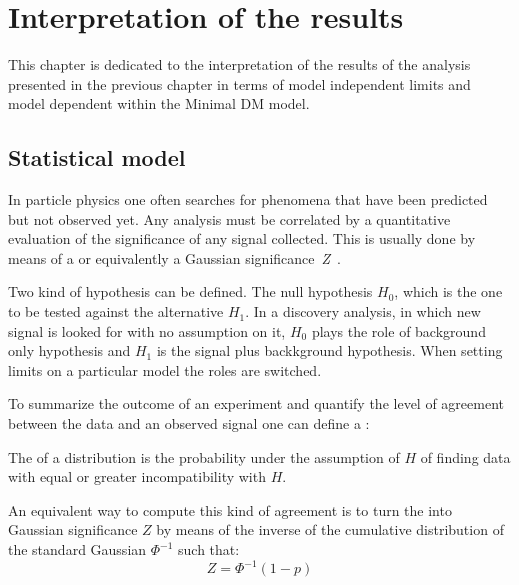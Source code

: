 \chapter{Interpretation of the results}

\lettrine{T}{}his chapter is dedicated to the interpretation of the results of the \mph analysis presented in the previous chapter in terms of model independent limits and model dependent within the Minimal DM model. 

\section{Statistical model}
In particle physics one often searches for phenomena that have been predicted but not observed yet. Any analysis must be correlated by a quantitative evaluation of the significance of any signal collected. This is usually done by means of a \p or equivalently a Gaussian \mbox{significance \emph{Z}~\cite{Cowan}}.

Two kind of hypothesis can be defined. The null hypothesis $H_{0}$, which is the one to be tested against the alternative $H_{1}$. In a discovery analysis, in which new signal is looked for with no assumption on it, $H_{0}$ plays the role of background only hypothesis and $H_{1}$ is the signal plus backkground hypothesis. When setting limits on a particular model the roles are switched.

To summarize the outcome of an experiment and quantify the level of agreement between the data and an observed signal one can define a \p:
\begin{definizione}
  The \p of a distribution is the probability under the assumption of $H$ of finding data with equal or greater incompatibility with $H$.
\end{definizione}

An equivalent way to compute this kind of agreement is to turn the \p into Gaussian significance $Z$ by means of the inverse of the cumulative distribution of the standard Gaussian $\Phi^{-1}$ such that:
\begin{equation}
  Z = \Phi^{-1}(1-p)
\end{equation}

